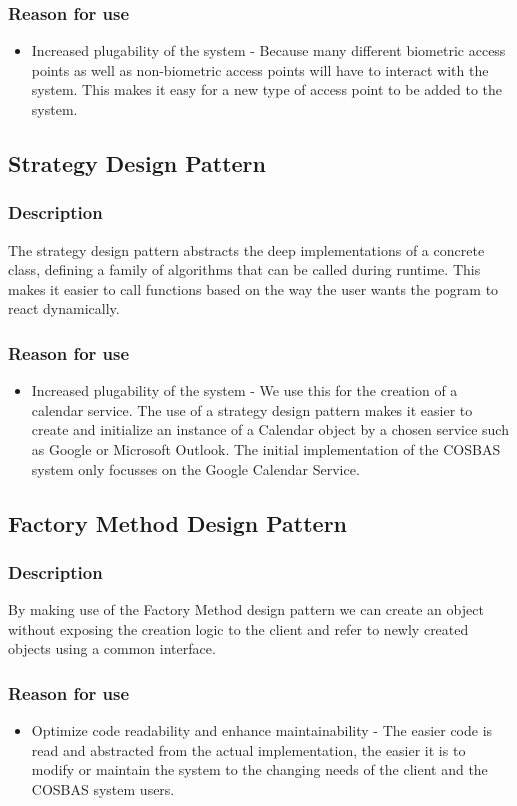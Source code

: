 	\subsubsection{Reason for use}
	\begin{itemize}
		\item{Increased plugability of the system} - Because many different biometric access points as well as non-biometric access points will have to interact with the system. This makes it easy for a new type of access point to be added to the system.
	\end{itemize}
	
\subsection{Strategy Design Pattern}
	\subsubsection{Description}
	The strategy design pattern abstracts the deep implementations of a concrete class, defining a family of algorithms that can be called during runtime. This makes it easier to call functions based on the way the user wants the pogram to react dynamically.
	
	
	\subsubsection{Reason for use}
	\begin{itemize}
		\item{Increased plugability of the system} - We use this for the creation of a calendar service. The use of a strategy design pattern makes it easier to create and initialize an instance of a Calendar object by a chosen service such as Google or Microsoft Outlook. The initial implementation of the COSBAS system only focusses on the Google Calendar Service.
	\end{itemize}
	
\subsection{Factory Method Design Pattern}
	\subsubsection{Description}
	By making use of the Factory Method design pattern we can create an object without exposing the creation logic to the client and refer to newly created objects using a common interface.
	
	\subsubsection{Reason for use}
	\begin{itemize}
		\item{Optimize code readability and enhance maintainability} - The easier code is read and abstracted from the actual implementation, the easier it is to modify or maintain the system to the changing needs of the client and the COSBAS system users. 
	\end{itemize}